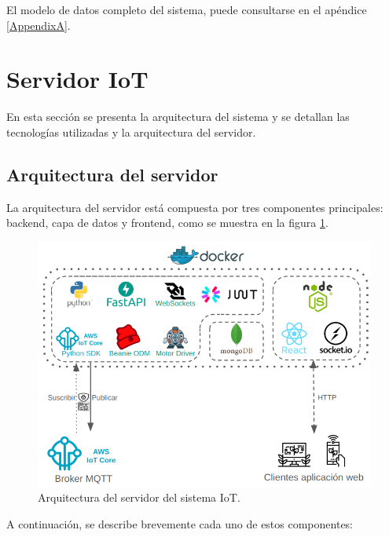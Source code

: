 El modelo de datos completo del sistema, puede consultarse en el apéndice
\ref{AppendixA}.

\section{Servidor IoT}

En esta sección se presenta la arquitectura del sistema y se detallan las
tecnologías utilizadas y la arquitectura del servidor.

\subsection{Arquitectura del servidor}

La arquitectura del servidor está compuesta por tres componentes principales:
backend, capa de datos y frontend, como se muestra en la figura
\ref{fig:arquitectura servidor}.

\begin{figure}[H]
    \centering
    \includegraphics[width=.97\textwidth]{./Images/16.png}
    \caption{Arquitectura del servidor del sistema IoT.}
    \label{fig:arquitectura servidor}
\end{figure}

A continuación, se describe brevemente cada uno de estos componentes:

